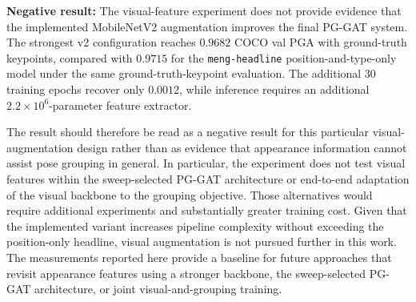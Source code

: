 \textbf{Negative result:}
The visual-feature experiment does not provide evidence that the
implemented MobileNetV2 augmentation improves the final PG-GAT system.
The strongest v2 configuration reaches $0.9682$ COCO val PGA with
ground-truth keypoints,
compared with $0.9715$ for the \texttt{meng-headline}
position-and-type-only model under the same ground-truth-keypoint
evaluation.
The additional 30 training epochs recover only $0.0012$,
while inference requires an additional $2.2\times10^{6}$-parameter
feature extractor.

The result should therefore be read as a negative result for this
particular visual-augmentation design
rather than as evidence that appearance information cannot assist pose
grouping in general.
In particular, the experiment does not test visual features within
the sweep-selected PG-GAT architecture or end-to-end adaptation of the
visual backbone to the grouping objective.
Those alternatives would require additional experiments and substantially
greater training cost.
Given that the implemented variant increases pipeline complexity without
exceeding the position-only headline,
visual augmentation is not pursued further in this work.
The measurements reported here provide a baseline for future approaches
that revisit appearance features using a stronger backbone,
the sweep-selected PG-GAT architecture,
or joint visual-and-grouping training.